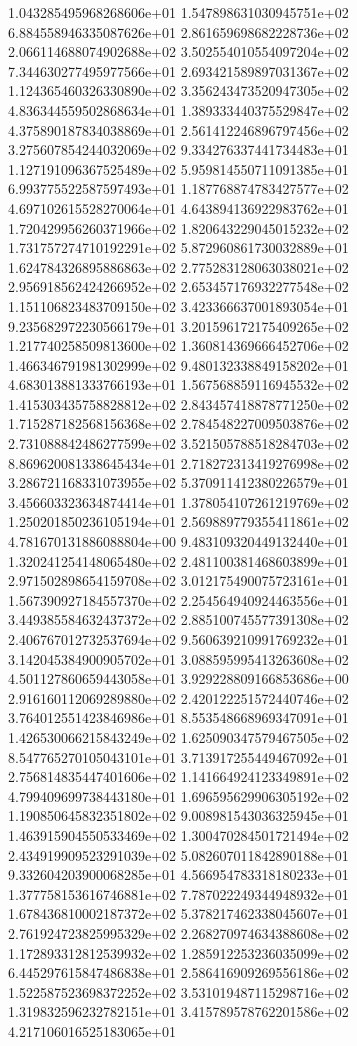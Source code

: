 1.043285495968268606e+01 1.547898631030945751e+02 6.884558946335087626e+01
2.861659698682228736e+02 2.066114688074902688e+02 3.502554010554097204e+02
7.344630277495977566e+01 2.693421589897031367e+02 1.124365460326330890e+02
3.356243473520947305e+02 4.836344559502868634e+01 1.389333440375529847e+02
4.375890187834038869e+01 2.561412246896797456e+02 3.275607854244032069e+02
9.334276337441734483e+01 1.127191096367525489e+02 5.959814550711091385e+01
6.993775522587597493e+01 1.187768874783427577e+02 4.697102615528270064e+01
4.643894136922983762e+01 1.720429956260371966e+02 1.820643229045015232e+02
1.731757274710192291e+02 5.872960861730032889e+01 1.624784326895886863e+02
2.775283128063038021e+02 2.956918562424266952e+02 2.653457176932277548e+02
1.151106823483709150e+02 3.423366637001893054e+01 9.235682972230566179e+01
3.201596172175409265e+02 1.217740258509813600e+02 1.360814369666452706e+02
1.466346791981302999e+02 9.480132338849158202e+01 4.683013881333766193e+01
1.567568859116945532e+02 1.415303435758828812e+02 2.843457418878771250e+02
1.715287182568156368e+02 2.784548227009503876e+02 2.731088842486277599e+02
3.521505788518284703e+02 8.869620081338645434e+01 2.718272313419276998e+02
3.286721168331073955e+02 5.370911412380226579e+01 3.456603323634874414e+01
1.378054107261219769e+02 1.250201850236105194e+01 2.569889779355411861e+02
4.781670131886088804e+00 9.483109320449132440e+01 1.320241254148065480e+02
2.481100381468603899e+01 2.971502898654159708e+02 3.012175490075723161e+01
1.567390927184557370e+02 2.254564940924463556e+01 3.449385584632437372e+02
2.885100745577391308e+02 2.406767012732537694e+02 9.560639210991769232e+01
3.142045384900905702e+01 3.088595995413263608e+02 4.501127860659443058e+01
3.929228809166853686e+00 2.916160112069289880e+02 2.420122251572440746e+02
3.764012551423846986e+01 8.553548668969347091e+01 1.426530066215843249e+02
1.625090347579467505e+02 8.547765270105043101e+01 3.713917255449467092e+01
2.756814835447401606e+02 1.141664924123349891e+02 4.799409699738443180e+01
1.696595629906305192e+02 1.190850645832351802e+02 9.008981543036325945e+01
1.463915904550533469e+02 1.300470284501721494e+02 2.434919909523291039e+02
5.082607011842890188e+01 9.332604203900068285e+01 4.566954783318180233e+01
1.377758153616746881e+02 7.787022249344948932e+01 1.678436810002187372e+02
5.378217462338045607e+01 2.761924723825995329e+02 2.268270974634388608e+02
1.172893312812539932e+02 1.285912253236035099e+02 6.445297615847486838e+01
2.586416909269556186e+02 1.522587523698372252e+02 3.531019487115298716e+02
1.319832596232782151e+01 3.415789578762201586e+02 4.217106016525183065e+01
